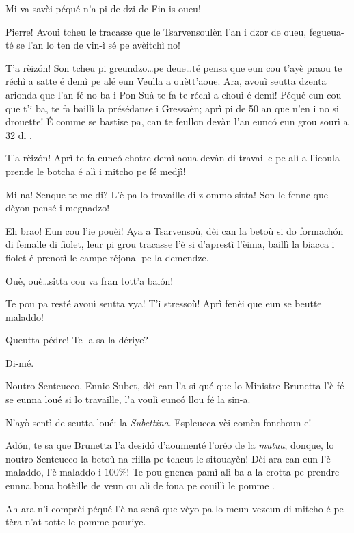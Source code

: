 \begin{drama}
\Pierrespeaks Mi va savèi péqué n'a pi de dzi de Fin-is oueu!

\Laurentspeaks Pierre! Avouì tcheu le tracasse que le Tsarvensoulèn l'an i dzor de oueu, fegueua-té se l'an lo ten de vin-ì sé pe avèitchì no!

\Pierrespeaks T'a rèiz\'on! Son tcheu pi greundzo\ldots pe deue\ldots té pensa que eun cou t'ayè praou te réchì a satte é demì pe alé eun Veulla a ouètt'aoue. Ara, avouì seutta dzenta arionda que l'an fé-no ba i Pon-Suà te fa te réchì a chouì é demì! Péqué eun cou que t'i  ba, te fa baillì la présédanse i Gressaèn; aprì pi de 50 an que n'en i no si drouette! \'E comme se bastise pa, can te feullon devàn l'an eunc\'o eun grou sourì a 32 di \sorrisone .

\Laurentspeaks T'a rèiz\'on! Aprì te fa eunc\'o chotre demì aoua devàn di travaille pe alì a l'icoula prende le botcha é alì i mitcho pe fé medjì!

\Pierrespeaks Mi na! Senque te me di? L'è pa lo travaille di-z-ommo sitta! Son le fenne que dèyon pensé i megnadzo!

\Laurentspeaks {} Eh brao! Eun cou l'ie pouèi! Aya a Tsarvensoù, dèi can la betoù si do formach\'on di femalle di fiolet, leur pi grou tracasse l'è si d'aprestì l'èima, baillì la biacca i fiolet é prenotì le campe réjonal pe la demendze.

\Pierrespeaks Ouè, ouè\ldots sitta cou va fran tott'a bal\'on!

\Laurentspeaks Te pou pa resté avouì seutta vya! T'i stressoù! Aprì fenèi que eun se beutte maladdo!

\Pierrespeaks Queutta pédre! Te la sa la dériye?

\Laurentspeaks Di-mé.

\Pierrespeaks Noutro Senteucco, Ennio Subet, dèi can l'a si qué que lo Ministre Brunetta l'è fé-se eunna loué si lo travaille, l'a voulì eunc\'o llou fé la sin-a.

\Laurentspeaks N'ayò sentì de seutta loué: la \textit{Subettina}. Espleucca vèi comèn fonchoun-e!

\Pierrespeaks Ad\'on, te sa que Brunetta l'a desid\'o d'aoumenté l'oréo de la \textit{mutua}; donque, lo noutro Senteucco la betoù na riilla pe tcheut le sitouayèn! Dèi ara can eun l'è maladdo, l'è maladdo i $100\%$! Te pou gnenca pamì alì ba a la crotta pe prendre eunna boua botèille de veun ou alì de foua pe couillì le pomme \mela .

\Laurentspeaks Ah ara n'i comprèi péqué l'è na senâ que vèyo pa lo meun vezeun di mitcho é pe tèra n'at totte le pomme pouriye.


\end{drama}
